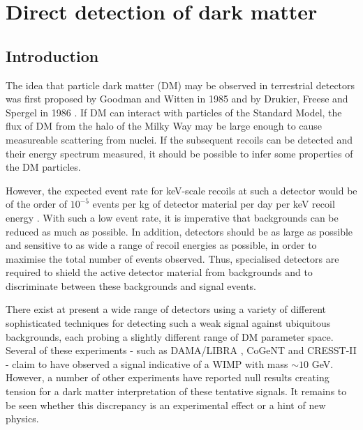 \chapter{Direct detection of dark matter}
\label{ch:DD}


\section{Introduction}

The idea that particle dark matter (DM) may be observed in terrestrial detectors was first proposed by Goodman and Witten in 1985 \cite{Goodman:1985} and by Drukier, Freese and Spergel in 1986 \cite{Drukier:1986}. If DM can interact with particles of the Standard Model, the flux of DM from the halo of the Milky Way may be large enough to cause measureable scattering from nuclei. If the subsequent recoils can be detected and their energy spectrum measured, it should be possible to infer some properties of the DM particles.

However, the expected event rate for keV-scale recoils at such a detector would be of the order of $10^{-5}$ events per kg of detector material per day per keV recoil energy \cite{Cerdeno:2010}. With such a low event rate, it is imperative that backgrounds can be reduced as much as possible. In addition, detectors should be as large as possible and sensitive to as wide a range of recoil energies as possible, in order to maximise the total number of events observed. Thus, specialised detectors are required to shield the active detector material from backgrounds and to discriminate between these backgrounds and signal events.

There exist at present a wide range of detectors using a variety of different sophisticated techniques for detecting such a weak signal against ubiquitous backgrounds, each probing a slightly different range of DM parameter space. Several of these experiments - such as DAMA/LIBRA \cite{Bernabei:2010}, CoGeNT \cite{Aalseth:2011a, Aalseth:2011b} and CRESST-II \cite{Stodolsky:2012} - claim to have observed a signal indicative of a WIMP with mass $\sim 10$ GeV. However, a number of other experiments have reported null results creating tension for a dark matter interpretation of these tentative signals. It remains to be seen whether this discrepancy is an experimental effect or a hint of new physics.

